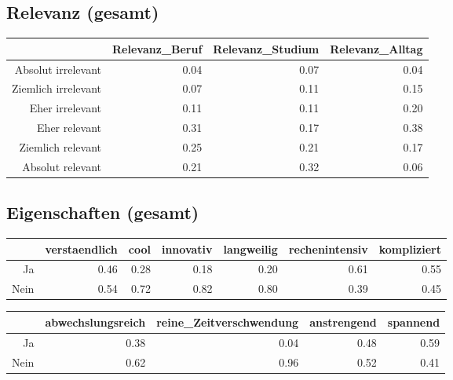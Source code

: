 \documentclass[12pt,a4paper,titlepage=true,parskip,ngerman]{scrartcl}
\begin{document}
\subsection{Relevanz (gesamt)}
\begin{table}[h]
\centering
\begin{tabular}{rrrr}
  \hline
 & Relevanz\_Beruf & Relevanz\_Studium & Relevanz\_Alltag \\ 
  \hline
Absolut irrelevant & 0.04 & 0.07 & 0.04 \\ 
  Ziemlich irrelevant & 0.07 & 0.11 & 0.15 \\ 
  Eher irrelevant & 0.11 & 0.11 & 0.20 \\ 
  Eher relevant & 0.31 & 0.17 & 0.38 \\ 
  Ziemlich relevant & 0.25 & 0.21 & 0.17 \\ 
  Absolut relevant & 0.21 & 0.32 & 0.06 \\ 
   \hline
\end{tabular}
\end{table}
\newpage


\subsection{Eigenschaften (gesamt)}
\begin{table}[ht]

\begin{tabular}{rrrrrrr}
  \hline
 & verstaendlich & cool & innovativ & langweilig & rechenintensiv & kompliziert \\ 
  \hline
Ja & 0.46 & 0.28 & 0.18 & 0.20 & 0.61 & 0.55 \\ 
  Nein & 0.54 & 0.72 & 0.82 & 0.80 & 0.39 & 0.45 \\ 
   \hline
\end{tabular}

\bigskip 

\begin{tabular}{rrrrr}
  \hline
 & abwechslungsreich & reine\_Zeitverschwendung & anstrengend & spannend \\ 
  \hline
Ja & 0.38 & 0.04 & 0.48 & 0.59 \\ 
  Nein & 0.62 & 0.96 & 0.52 & 0.41 \\ 
   \hline
\end{tabular}
\end{table}
\end{document}
